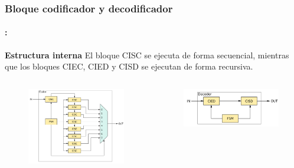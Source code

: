 \begin{frame}
  \frametitle{\textbf{\textbf{Bloque codificador y decodificador}}}
      \framesubtitle{\secname : \subsecname}
    \begin{block}{\centering \textbf{Estructura interna}}
    El bloque CISC se ejecuta de forma secuencial, mientras que los bloques CIEC, CIED y CISD se ejecutan de forma recursiva.
    \end{block}
    \begin{columns}
        \begin{column}{0.5\linewidth}  
        \begin{figure}
            \centering
        \includegraphics[width=\textwidth]{Diagramas/internal_coder.png}%
        \end{figure}
        \end{column}
        \begin{column}{0.5\linewidth}
        \begin{figure}
            \centering
        \includegraphics[width=\textwidth]{Diagramas/internal_decoder.png}
        \end{figure}
        \end{column}
    \end{columns}
\end{frame}

